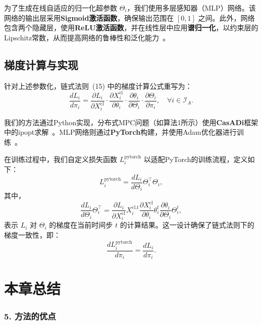 \documentclass[lang=chs, degree=master, blindreview=false, winfonts=true]{yanputhesis}
\begin{document}
为了生成在线自适应的归一化超参数 \( \Theta_i \)，我们使用多层感知器（MLP）网络。该网络的输出层采用\textbf{Sigmoid激活函数}，确保输出范围在 \([0, 1]\) 之间。此外，网络包含两个隐藏层，使用\textbf{ReLU激活函数}，并在线性层中应用\textbf{谱归一化}，以约束层的Lipschitz常数，从而提高网络的鲁棒性和泛化能力~\cite{ref42}。

\subsection{梯度计算与实现}

针对上述参数化，链式法则~(15) 中的梯度计算公式重写为：
\begin{equation}
    \frac{d L_i}{d \pi_i} = \frac{\partial L_i}{\partial X_i^\text{cl}} \cdot \frac{\partial X_i^\text{cl}}{\partial \theta_i} \cdot \frac{\partial \theta_i}{\partial \Theta_i} \cdot \frac{\partial \Theta_i}{\partial \pi_i}, \quad \forall i \in \mathcal{I}_A.
\end{equation}

我们的方法通过Python实现，分布式MPC问题（如算法1所示）使用\textbf{CasADi}框架中的ipopt求解~\cite{Andersson2019}。MLP网络则通过\textbf{PyTorch}构建，并使用Adam优化器进行训练~\cite{ref44, ref45}。

在训练过程中，我们自定义损失函数 \( L_i^\text{pytorch} \) 以适配PyTorch的训练流程，定义如下：
\begin{equation}
    L_i^\text{pytorch} = \frac{d L_i}{d \Theta_i} \Theta_i^\top \Theta_i,
\end{equation}
其中，
\begin{equation}
    \frac{d L_i}{d \Theta_i} \Theta_i^\top = \frac{\partial L_i}{\partial X_i^\text{cl}} X_i^\text{cl,t} \frac{\partial X_i^\text{cl}}{\partial \theta_i} \theta_i^t \frac{\partial \theta_i}{\partial \Theta_i} \Theta_i^t,
\end{equation}
表示 \( L_i \) 对 \( \Theta_i \) 的梯度在当前时间步 \( t \) 的计算结果。这一设计确保了链式法则下的梯度一致性，即：
\begin{equation}
    \frac{d L_i^\text{pytorch}}{d \pi_i} = \frac{d L_i}{d \pi_i}.
\end{equation}


\section{本章总结}
\subsubsection{5. 方法的优点}
\end{document}
